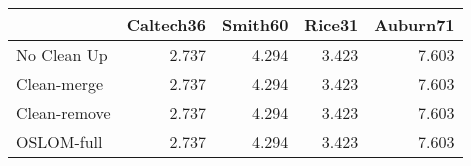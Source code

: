 \begin{tabular}{lrrrr}
\toprule
{} & Caltech36 & Smith60 & Rice31 & Auburn71 \\
\midrule
No Clean Up  &     2.737 &   4.294 &  3.423 &    7.603 \\
Clean-merge  &     2.737 &   4.294 &  3.423 &    7.603 \\
Clean-remove &     2.737 &   4.294 &  3.423 &    7.603 \\
OSLOM-full   &     2.737 &   4.294 &  3.423 &    7.603 \\
\bottomrule
\end{tabular}
